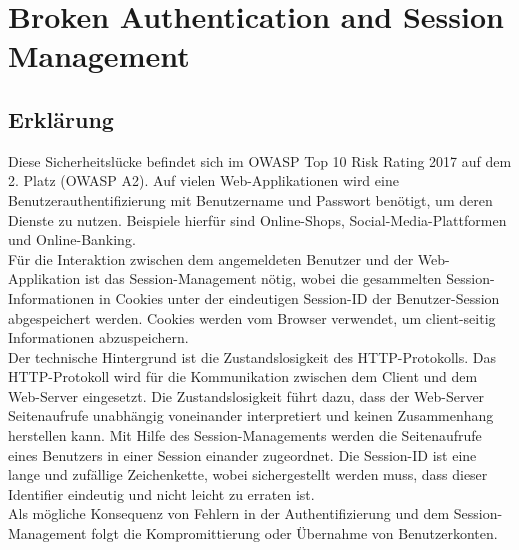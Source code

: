 \chapter{Broken Authentication and Session Management}
\label{BrokenAuthenticationAndSessionManagement}

\section{Erklärung}
Diese Sicherheitslücke befindet sich im OWASP Top 10 Risk Rating 2017 auf dem 2. Platz (OWASP A2). 
Auf vielen Web-Applikationen wird eine Benutzerauthentifizierung mit Benutzername und Passwort benötigt, um deren Dienste zu nutzen. Beispiele hierfür sind Online-Shops, Social-Media-Plattformen und Online-Banking. 
\\
Für die Interaktion zwischen dem angemeldeten Benutzer und der Web-Applikation ist das Session-Management nötig, wobei die gesammelten Session-Informationen in Cookies unter der eindeutigen Session-ID der Benutzer-Session abgespeichert werden. Cookies werden vom Browser verwendet, um client-seitig Informationen abzuspeichern.
\\
Der technische Hintergrund ist die Zustandslosigkeit des HTTP-Protokolls. Das HTTP-Protokoll wird für die Kommunikation zwischen dem Client und dem Web-Server eingesetzt. Die Zustandslosigkeit führt dazu, dass der Web-Server Seitenaufrufe unabhängig voneinander interpretiert und keinen Zusammenhang herstellen kann. Mit Hilfe des Session-Managements werden die Seitenaufrufe eines Benutzers in einer Session einander zugeordnet. Die Session-ID ist eine lange und zufällige Zeichenkette, wobei sichergestellt werden muss, dass dieser Identifier eindeutig und nicht leicht zu erraten ist.
\\
Als mögliche Konsequenz von Fehlern in der Authentifizierung und dem Session-Management folgt die Kompromittierung oder Übernahme von Benutzerkonten.

